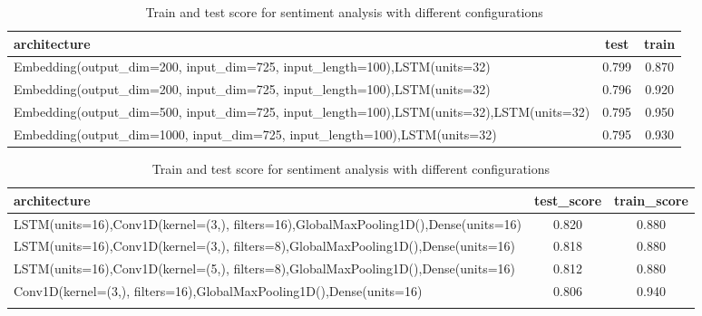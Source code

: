\documentclass[10pt]{SelfArx} %
\begin{document}
\begin{table}[]
	\begin{tabular*}{1\linewidth}{@{\extracolsep{\fill} }lcc@{}}
		\toprule
		architecture & test & train \\ \midrule
		Embedding(output\_dim=200, input\_dim=725, input\_length=100),LSTM(units=32) & 0.799 & 0.870 \\
		Embedding(output\_dim=200, input\_dim=725, input\_length=100),LSTM(units=32) & 0.796 & 0.920 \\
		Embedding(output\_dim=500, input\_dim=725, input\_length=100),LSTM(units=32),LSTM(units=32) & 0.795 & 0.950 \\
		Embedding(output\_dim=1000, input\_dim=725, input\_length=100),LSTM(units=32) & 0.795 & 0.930 \\ \bottomrule
	\end{tabular*}
\caption{Train and test score for sentiment analysis with different configurations}
\label{tsentiment2}
\end{table}
\begin{table}[t!]
	\begin{tabular*}{1\linewidth}{@{\extracolsep{\fill} }lcc@{}}
		\toprule
		architecture & test\_score & train\_score \\ \midrule
		LSTM(units=16),Conv1D(kernel=(3,), filters=16),GlobalMaxPooling1D(),Dense(units=16) & 0.820 & 0.880 \\
		LSTM(units=16),Conv1D(kernel=(3,), filters=8),GlobalMaxPooling1D(),Dense(units=16) & 0.818 & 0.880 \\
	LSTM(units=16),Conv1D(kernel=(5,), filters=8),GlobalMaxPooling1D(),Dense(units=16) & 0.812 & 0.880 \\
		Conv1D(kernel=(3,), filters=16),GlobalMaxPooling1D(),Dense(units=16) & 0.806 & 0.940 \\
		\multicolumn{1}{l}{} &  &  \\ \bottomrule
	\end{tabular*}
\caption{Train and test score for sentiment analysis with different configurations}
\label{tsentiment3}
\end{table}
\end{document}
